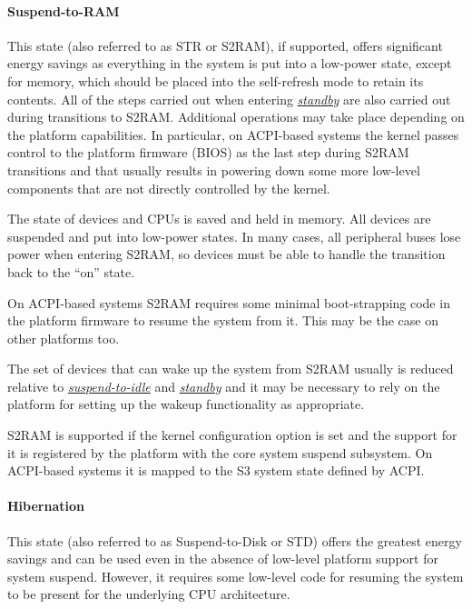 \documentclass[a4paper,8pt,english]{sphinxmanual}
\begin{document}
\paragraph{Suspend-to-RAM}
\label{admin-guide/pm/sleep-states:s2ram}\label{admin-guide/pm/sleep-states:suspend-to-ram}
This state (also referred to as STR or S2RAM), if supported, offers significant
energy savings as everything in the system is put into a low-power state, except
for memory, which should be placed into the self-refresh mode to retain its
contents.  All of the steps carried out when entering {\hyperref[admin\string-guide/pm/sleep\string-states:standby]{\emph{standby}}}
are also carried out during transitions to S2RAM.  Additional operations may
take place depending on the platform capabilities.  In particular, on ACPI-based
systems the kernel passes control to the platform firmware (BIOS) as the last
step during S2RAM transitions and that usually results in powering down some
more low-level components that are not directly controlled by the kernel.

The state of devices and CPUs is saved and held in memory.  All devices are
suspended and put into low-power states.  In many cases, all peripheral buses
lose power when entering S2RAM, so devices must be able to handle the transition
back to the ``on'' state.

On ACPI-based systems S2RAM requires some minimal boot-strapping code in the
platform firmware to resume the system from it.  This may be the case on other
platforms too.

The set of devices that can wake up the system from S2RAM usually is reduced
relative to {\hyperref[admin\string-guide/pm/sleep\string-states:s2idle]{\emph{suspend-to-idle}}} and {\hyperref[admin\string-guide/pm/sleep\string-states:standby]{\emph{standby}}} and it
may be necessary to rely on the platform for setting up the wakeup functionality
as appropriate.

S2RAM is supported if the  kernel configuration option
is set and the support for it is registered by the platform with the core system
suspend subsystem.  On ACPI-based systems it is mapped to the S3 system state
defined by ACPI.


\paragraph{Hibernation}
\label{admin-guide/pm/sleep-states:hibernation}\label{admin-guide/pm/sleep-states:id2}
This state (also referred to as Suspend-to-Disk or STD) offers the greatest
energy savings and can be used even in the absence of low-level platform support
for system suspend.  However, it requires some low-level code for resuming the
system to be present for the underlying CPU architecture.
\end{document}
